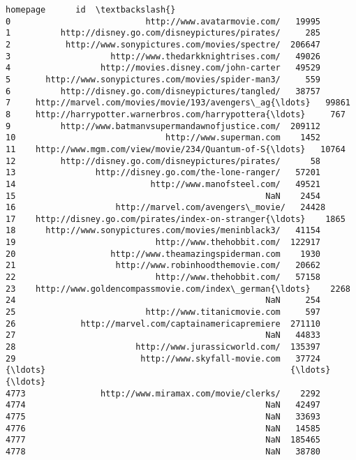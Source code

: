 \documentclass[11pt]{article}
\begin{document}
\begin{Verbatim}[commandchars=\\\{\}]
                                               homepage      id  \textbackslash{}
0                           http://www.avatarmovie.com/   19995   
1          http://disney.go.com/disneypictures/pirates/     285   
2           http://www.sonypictures.com/movies/spectre/  206647   
3                    http://www.thedarkknightrises.com/   49026   
4                  http://movies.disney.com/john-carter   49529   
5       http://www.sonypictures.com/movies/spider-man3/     559   
6          http://disney.go.com/disneypictures/tangled/   38757   
7     http://marvel.com/movies/movie/193/avengers\_ag{\ldots}   99861   
8     http://harrypotter.warnerbros.com/harrypottera{\ldots}     767   
9          http://www.batmanvsupermandawnofjustice.com/  209112   
10                              http://www.superman.com    1452   
11    http://www.mgm.com/view/movie/234/Quantum-of-S{\ldots}   10764   
12         http://disney.go.com/disneypictures/pirates/      58   
13                http://disney.go.com/the-lone-ranger/   57201   
14                           http://www.manofsteel.com/   49521   
15                                                  NaN    2454   
16                    http://marvel.com/avengers\_movie/   24428   
17    http://disney.go.com/pirates/index-on-stranger{\ldots}    1865   
18      http://www.sonypictures.com/movies/meninblack3/   41154   
19                            http://www.thehobbit.com/  122917   
20                   http://www.theamazingspiderman.com    1930   
21                    http://www.robinhoodthemovie.com/   20662   
22                            http://www.thehobbit.com/   57158   
23    http://www.goldencompassmovie.com/index\_german{\ldots}    2268   
24                                                  NaN     254   
25                          http://www.titanicmovie.com     597   
26             http://marvel.com/captainamericapremiere  271110   
27                                                  NaN   44833   
28                        http://www.jurassicworld.com/  135397   
29                         http://www.skyfall-movie.com   37724   
{\ldots}                                                 {\ldots}     {\ldots}   
4773               http://www.miramax.com/movie/clerks/    2292   
4774                                                NaN   42497   
4775                                                NaN   33693   
4776                                                NaN   14585   
4777                                                NaN  185465   
4778                                                NaN   38780   

\end{Verbatim}
\end{document}
